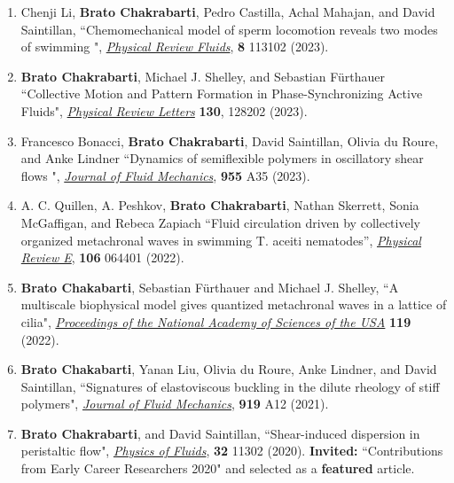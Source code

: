 \documentclass[10pt]{res} %
\begin{document}
\begin{resume}
\begin{enumerate}[topsep=0pt,itemsep= 1ex]
\item Chenji Li, \textbf{Brato Chakrabarti}, Pedro Castilla, Achal Mahajan, and David Saintillan, ``Chemomechanical model of sperm locomotion reveals two modes of swimming
", \href{https://doi.org/10.1103/PhysRevFluids.8.113102}{\textit{Physical Review Fluids}}, \textbf{8} 113102 (2023). 
	
\item  \textbf{Brato Chakrabarti}, Michael J. Shelley, and  Sebastian F\"{u}rthauer ``Collective Motion and Pattern Formation in Phase-Synchronizing Active Fluids", \href{https://doi.org/10.1103/PhysRevLett.130.128202}{\textit{Physical Review Letters}} \textbf{130}, 128202 (2023).

\item Francesco Bonacci, \textbf{Brato Chakrabarti}, David Saintillan, Olivia du Roure, and Anke Lindner ``Dynamics of semiflexible polymers in oscillatory shear flows ", \href{https://doi.org/10.1017/jfm.2022.1040}{\textit{Journal of Fluid Mechanics}},  \textbf{955} A35 (2023).

\item  A. C. Quillen, A. Peshkov, \textbf{Brato Chakrabarti}, Nathan Skerrett, Sonia McGaffigan, and Rebeca Zapiach “Fluid circulation driven by collectively organized metachronal waves in swimming T. aceiti nematodes'',  \href{https://doi.org/10.1103/PhysRevE.106.06440}{\textit{Physical Review E}}, \textbf{106} 064401 (2022).  

\item \textbf{Brato Chakabarti}, Sebastian F\"{u}rthauer and Michael J. Shelley, ``A multiscale biophysical model gives quantized metachronal waves in a lattice of cilia",   \href{https://doi.org/10.1073/pnas.2113539119}{\textit{Proceedings of the National Academy of Sciences of the USA}} \textbf{119} (2022). 

\item \textbf{Brato Chakabarti}, Yanan Liu, Olivia du Roure, Anke Lindner, and David Saintillan, ``Signatures of elastoviscous buckling in the dilute rheology of stiff polymers",  \href{https://doi.org/10.1017/jfm.2021.383}{\textit{Journal of Fluid Mechanics}},  \textbf{919} A12 (2021).

\item \textbf{Brato Chakrabarti}, and David Saintillan, ``Shear-induced dispersion in peristaltic flow", \href{https://doi.org/10.1063/5.0030569}{\textit{Physics of Fluids}}, \textbf{32} 11302 (2020).  \textbf{Invited:} ``Contributions from Early Career Researchers 2020" and selected as a \textbf{featured} article.


\end{enumerate}
\end{resume}
\end{document}
